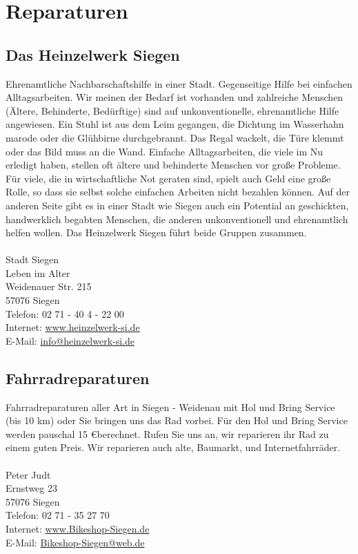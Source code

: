 \chapter{Reparaturen} 

\section{Das Heinzelwerk Siegen}
Ehrenamtliche Nachbarschaftshilfe in einer Stadt. Gegenseitige Hilfe bei einfachen Alltagsarbeiten. Wir meinen der Bedarf ist vorhanden und zahlreiche Menschen (Ältere, Behinderte, Bedürftige) sind auf unkonventionelle, ehrenamtliche Hilfe angewiesen.  
Ein Stuhl ist aus dem Leim gegangen, die Dichtung im Wasserhahn marode oder die Glühbirne durchgebrannt. Das Regal wackelt, die 
Türe klemmt oder das Bild muss an die Wand.  Einfache Alltagsarbeiten, die viele im Nu erledigt haben, stellen oft ältere und behinderte Menschen vor große Probleme. Für viele, die in wirtschaftliche Not geraten sind, spielt auch Geld eine große Rolle, so dass sie selbst solche einfachen Arbeiten nicht bezahlen können.  Auf der anderen Seite gibt es in einer Stadt wie Siegen auch ein 
Potential an geschickten, handwerklich begabten Menschen, die anderen unkonventionell und ehrenamtlich helfen wollen. 
Das Heinzelwerk Siegen führt beide Gruppen zusammen.\\
\\
Stadt Siegen\\
Leben im Alter\\
Weidenauer Str. 215\\
57076 Siegen \\
Telefon: 02 71 - 40 4 - 22 00 \\
Internet: \href{http://www.heinzelwerk-si.de}{www.heinzelwerk-si.de} \\
E-Mail: \href{mailto:info@heinzelwerk-si.de}{info@heinzelwerk-si.de} 
 
\section{Fahrradreparaturen}
Fahrradreparaturen aller Art in Siegen - Weidenau mit Hol und Bring Service (bis 10 km) oder Sie bringen uns das Rad vorbei. Für den Hol und Bring Service werden pauschal 15 \euro berechnet. Rufen Sie uns an, wir reparieren ihr Rad zu einem guten Preis. Wir reparieren auch alte, Baumarkt, und Internetfahrräder. \\
\\
Peter Judt \\
Ernstweg 23 \\
57076 Siegen \\
Telefon: 02 71 - 35 27 70 \\ 
Internet: \href{www.Bikeshop-Siegen.de}{www.Bikeshop-Siegen.de}\\
E-Mail: \href{mailto:Bikeshop-Siegen@web.de}{Bikeshop-Siegen@web.de}

